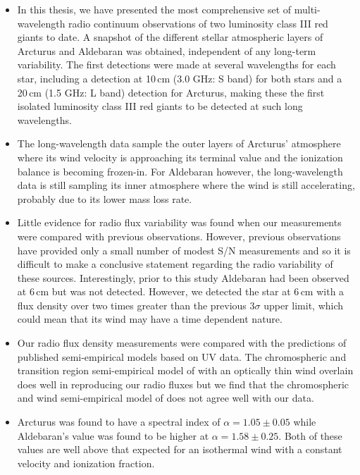 \begin{itemize}
	\item In this thesis, we have presented the most comprehensive set of multi-wavelength radio continuum observations of two luminosity class III red giants to date. A snapshot of the different stellar atmospheric layers of Arcturus and Aldebaran was obtained, independent of any long-term variability. The first detections were made at several wavelengths for each star, including a detection at 10\,cm (3.0 GHz: S band) for both stars and a 20\,cm (1.5 GHz: L band) detection for Arcturus, making these the first isolated luminosity class III red giants to be detected at such long wavelengths.
  
	\item The long-wavelength data sample the outer layers of Arcturus' atmosphere where its wind velocity is approaching its terminal value and the ionization balance is becoming frozen-in. For Aldebaran however, the long-wavelength data is still sampling its inner atmosphere where the wind is still accelerating, probably due to its lower mass loss rate. 

	\item Little evidence for radio flux variability was found when our measurements were compared with previous observations. However, previous observations have provided only a small number of modest S/N measurements and so it is difficult to make a conclusive statement regarding the radio variability of these sources. Interestingly, prior to this study Aldebaran had been observed at 6\,cm but was not detected. However, we detected the star at 6\,cm with a flux density over two times greater than the previous $3\sigma$ upper limit, which could mean that its wind may have a time dependent nature.
	  
	\item Our radio flux density measurements were compared with the predictions of published semi-empirical models based on UV data. The chromospheric and transition region semi-empirical model of \cite{mcmurry_1999} with an optically thin wind overlain does well in reproducing our radio fluxes but we find that the chromospheric and wind semi-empirical model of \cite{drake_1985} does not agree well with our data.
  
	\item Arcturus was found to have a spectral index of $\alpha = 1.05 \pm 0.05$ while Aldebaran's value was found to be higher at $\alpha = 1.58 \pm 0.25$. Both of these values are well above that expected for an isothermal wind with a constant velocity and ionization fraction.


\end{itemize}
